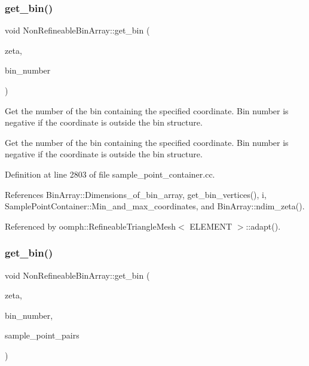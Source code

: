 \mbox{\label{classNonRefineableBinArray_a02617f0c049a443f5d13ab6d09b6e156}} 
\subsubsection{\texorpdfstring{get\+\_\+bin()}{get\_bin()}\hspace{0.1cm}{\footnotesize\ttfamily [1/2]}}
{\footnotesize\ttfamily void Non\+Refineable\+Bin\+Array\+::get\+\_\+bin (\begin{DoxyParamCaption}\item[{const Vector$<$ double $>$ \&}]{zeta,  }\item[{int \&}]{bin\+\_\+number }\end{DoxyParamCaption})}



Get the number of the bin containing the specified coordinate. Bin number is negative if the coordinate is outside the bin structure. 

Get the number of the bin containing the specified coordinate. Bin number is negative if the coordinate is outside the bin structure. 

Definition at line 2803 of file sample\+\_\+point\+\_\+container.\+cc.



References Bin\+Array\+::\+Dimensions\+\_\+of\+\_\+bin\+\_\+array, get\+\_\+bin\+\_\+vertices(), i, Sample\+Point\+Container\+::\+Min\+\_\+and\+\_\+max\+\_\+coordinates, and Bin\+Array\+::ndim\+\_\+zeta().



Referenced by oomph\+::\+Refineable\+Triangle\+Mesh$<$ E\+L\+E\+M\+E\+N\+T $>$\+::adapt().

\mbox{\label{classNonRefineableBinArray_a9482f2913608b1ce36c75acacdaf99e7}} 
\subsubsection{\texorpdfstring{get\+\_\+bin()}{get\_bin()}\hspace{0.1cm}{\footnotesize\ttfamily [2/2]}}
{\footnotesize\ttfamily void Non\+Refineable\+Bin\+Array\+::get\+\_\+bin (\begin{DoxyParamCaption}\item[{const Vector$<$ double $>$ \&}]{zeta,  }\item[{int \&}]{bin\+\_\+number,  }\item[{Vector$<$ std\+::pair$<$ Finite\+Element $\ast$, Vector$<$ double $>$ $>$ $>$ \&}]{sample\+\_\+point\+\_\+pairs }\end{DoxyParamCaption})}



